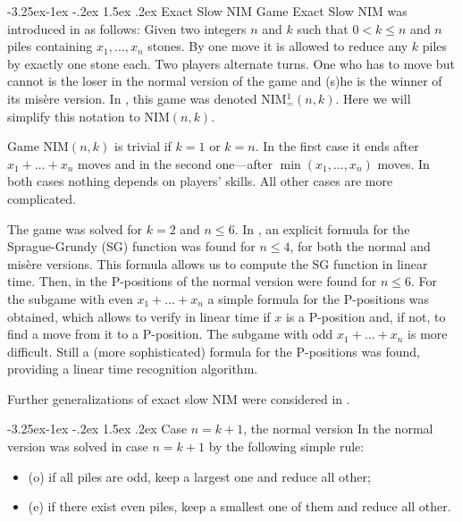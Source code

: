 \documentclass[10pt]{article}
\makeatletter
\renewcommand\subsection{\@startsection{subsection}{2}{\z@}
{-3.25ex\@plus -1ex \@minus -.2ex}
{1.5ex \@plus .2ex}
{\normalfont\normalsize\bfseries\boldmath}}
\theoremstyle{definition}
\makeatother
\begin{document}
\subsection{Exact Slow NIM} 
\label{ss00}
Game Exact Slow NIM  
was introduced in \cite{GH15} as follows: 
Given two integers  $n$ and $k$  
such that  $0 < k \leq n$  and  
$n$  piles containing  $x_1, \dots, x_n$  stones.  
By one move it is allowed to reduce any  $k$  piles 
by exactly one stone each. 
Two players alternate turns. 
One who has to move but cannot is the loser 
in the normal version of the game and 
(s)he is the winner of its mis\`ere version. 
In \cite{GH15}, this game was denoted  NIM$^1_=(n,k)$.
Here we will simplify this notation to  NIM$(n,k)$.

Game NIM$(n,k)$  is trivial if  $k = 1$  or  $k = n$. 
In the first case it ends after $x_1 + \ldots + x_n$ moves  
and in the second one---after  $\min(x_1, \ldots, x_n)$ 
moves. In both cases nothing depends on players' skills. 
All other cases are more complicated. 

The game was solved for  $k=2$  and  $n \leq 6$.
In \cite{GHHC20}, an explicit formula 
for the Sprague-Grundy 
(SG) function was found for  $n \leq 4$, 
for both the normal and mis\`ere versions. 
This formula allows us to compute  the SG function in linear time. 
Then, in \cite{CGKPV21} the P-positions 
of the normal version were found for  $n \leq 6$.  
For the subgame with even  $x_1 + \ldots + x_n$ 
a simple formula for the P-positions was obtained, 
which allows to verify in linear time 
if  $x$ is a P-position and, if not, 
to find a move from it to a P-position.  
The subgame with odd  $x_1 + \ldots + x_n$ is  more difficult. 
Still a (more sophisticated)  formula 
for the P-positions was found,  
providing a linear time recognition algorithm.

Further generalizations of exact slow NIM 
were considered in \cite{GMN23,GN23,GN23a}.

\subsection{Case $n = k+1$, the normal version}
\label{ss01}
In \cite{GMMV23} the normal version 
was solved in case $n = k+1$  by the following simple rule: 
\begin{itemize}
\item{(o)} if all piles are odd, 
keep a largest one and reduce all other;
\item{(e)} if there exist even piles, 
keep a smallest one of them and reduce all other.
\end{itemize}
\end{document}
